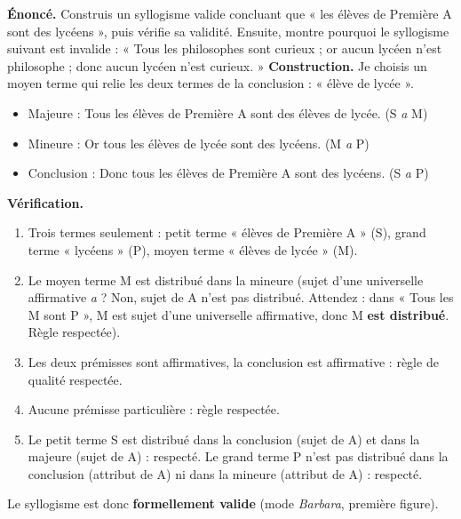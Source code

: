 \documentclass[11pt]{article}
\begin{document}
\begin{exoresolu}
\textbf{Énoncé.} Construis un syllogisme valide concluant que « les élèves de Première A sont des lycéens », puis vérifie sa validité. Ensuite, montre pourquoi le syllogisme suivant est invalide : « Tous les philosophes sont curieux ; or aucun lycéen n'est philosophe ; donc aucun lycéen n'est curieux. »
\tcblower
\textbf{Construction.} Je choisis un moyen terme qui relie les deux termes de la conclusion : « élève de lycée ».
\begin{itemize}
\item Majeure : Tous les élèves de Première A sont des élèves de lycée. (S \textit{a} M)
\item Mineure : Or tous les élèves de lycée sont des lycéens. (M \textit{a} P)
\item Conclusion : Donc tous les élèves de Première A sont des lycéens. (S \textit{a} P)
\end{itemize}
\textbf{Vérification.}
\begin{enumerate}
\item Trois termes seulement : petit terme « élèves de Première A » (S), grand terme « lycéens » (P), moyen terme « élèves de lycée » (M).
\item Le moyen terme M est distribué dans la mineure (sujet d'une universelle affirmative \textit{a} ? Non, sujet de A n'est pas distribué. Attendez : dans « Tous les M sont P », M est sujet d'une universelle affirmative, donc M \textbf{est distribué}. Règle respectée).
\item Les deux prémisses sont affirmatives, la conclusion est affirmative : règle de qualité respectée.
\item Aucune prémisse particulière : règle respectée.
\item Le petit terme S est distribué dans la conclusion (sujet de A) et dans la majeure (sujet de A) : respecté. Le grand terme P n'est pas distribué dans la conclusion (attribut de A) ni dans la mineure (attribut de A) : respecté.
\end{enumerate}
Le syllogisme est donc \textbf{formellement valide} (mode \textit{Barbara}, première figure).


\end{exoresolu}
\end{document}
